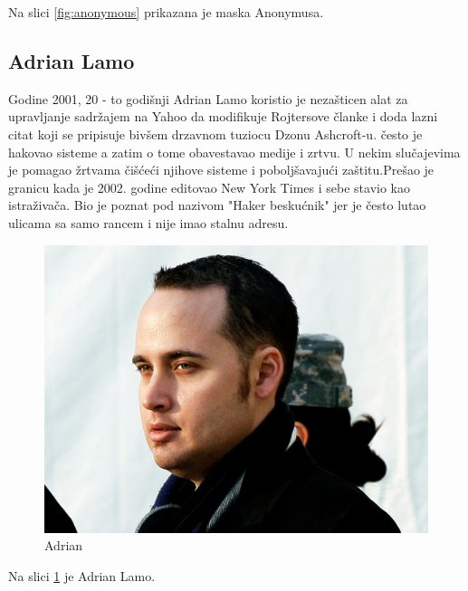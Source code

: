 \documentclass[a4paper]{article}
\begin{document}
 Na slici \ref{fig:anonymous} prikazana je maska Anonymusa. 
 
 \subsection{Adrian Lamo}
Godine 2001, 20 - to godišnji Adrian Lamo koristio je nezašticen alat za upravljanje sadržajem na Yahoo da modifikuje Rojtersove članke i doda lazni citat koji se pripisuje bivšem drzavnom tuziocu Dzonu Ashcroft-u. često je hakovao sisteme a zatim o tome obavestavao medije i zrtvu. U nekim slučajevima je pomagao žrtvama čišćeći njihove sisteme i poboljšavajući zaštitu.Prešao je granicu kada je 2002. godine editovao New York Times i sebe stavio kao istraživača. Bio je poznat pod nazivom "Haker beskućnik" jer je često lutao ulicama sa samo rancem i nije imao stalnu adresu.
\begin{figure}[h!]
	\begin{center}
		\includegraphics[scale=0.10]{adrian.jpg}
	\end{center}
	\caption{Adrian}
	\label{fig:adrian}
\end{figure}

Na slici \ref{fig:adrian} je Adrian Lamo.

\newpage
\end{document}
